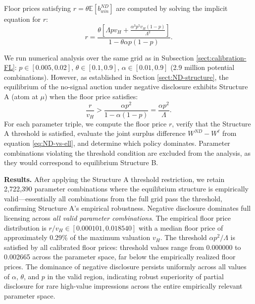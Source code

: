 \documentclass[11pt]{article}
\theoremstyle{plain}
\theoremstyle{definition}
\theoremstyle{plain}
\theoremstyle{plain}
\theoremstyle{plain}
\theoremstyle{plain}
\numberwithin{equation}{section}
\begin{document}
\vspace{2mm}

\noindent Floor prices satisfying $r = \theta \mathbb{E}[b_{win}^{ND}]$ are computed by solving the implicit equation for $r$:
\begin{equation*}
    r = \frac{\theta\left[\Lambda p v_H + \frac{\alpha^3 p^5 v_H(1-p)}{\Lambda^2}\right]}{1 - \theta \alpha p(1-p)}.
\end{equation*}

\noindent We run numerical analysis over the same grid as in Subsection \ref{sect:calibration-FL}: $p \in [0.005, 0.02]$, $\theta \in [0.1, 0.9]$, $\alpha \in [0.01, 0.9]$ (2.9 million potential combinations). However, as established in Section \ref{sect:ND-structure}, the equilibrium of the no-signal auction under negative disclosure exhibits Structure A (atom at $\mu$) when the floor price satisfies:
\begin{equation*}
    \frac{r}{v_H} > \frac{\alpha p^2}{1 - \alpha(1-p)} = \frac{\alpha p^2}{\Lambda}.
\end{equation*}
For each parameter triple, we compute the floor price $r$, verify that the Structure A threshold is satisfied, evaluate the joint surplus difference $W^{ND} - W^\ell$ from equation \eqref{eq:ND-vs-ell}, and determine which policy dominates. Parameter combinations violating the threshold condition are excluded from the analysis, as they would correspond to equilibrium Structure B.\par

\vspace{2mm}

\noindent \textbf{Results.} After applying the Structure A threshold restriction, we retain 2,722,390 parameter combinations where the equilibrium structure is empirically valid---essentially all combinations from the full grid pass the threshold, confirming Structure A's empirical robustness. Negative disclosure dominates full licensing across \textit{all valid parameter combinations}. The empirical floor price distribution is $r/v_H \in [0.000101, 0.018540]$ with a median floor price of approximately 0.29\% of the maximum valuation $v_H$. The threshold $\alpha p^2/\Lambda$ is satisfied by all calibrated floor prices: threshold values range from 0.000000 to 0.002665 across the parameter space, far below the empirically realized floor prices. The dominance of negative disclosure persists uniformly across all values of $\alpha$, $\theta$, and $p$ in the valid region, indicating robust superiority of partial disclosure for rare high-value impressions across the entire empirically relevant parameter space.
\end{document}
